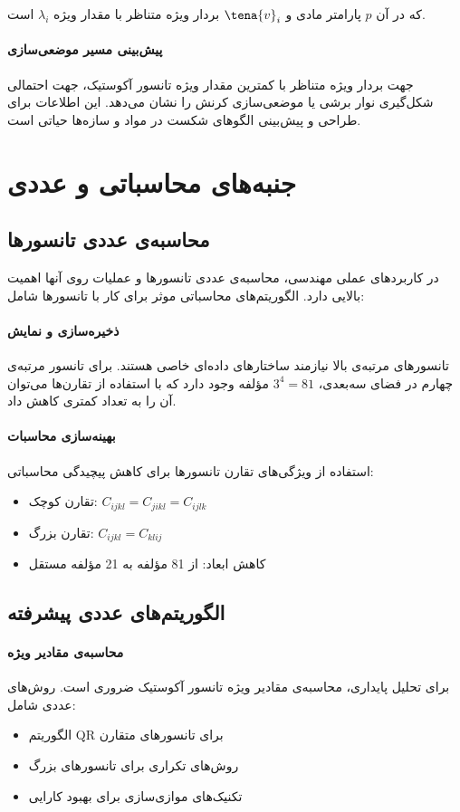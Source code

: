 که در آن $p$ پارامتر مادی و $\tena{v}_i$ بردار ویژه متناظر با مقدار ویژه $\lambda_i$ است.

\paragraph{پیش‌بینی مسیر موضعی‌سازی}
جهت بردار ویژه متناظر با کمترین مقدار ویژه تانسور آکوستیک، جهت احتمالی شکل‌گیری نوار برشی یا موضعی‌سازی کرنش را نشان می‌دهد. این اطلاعات برای طراحی و پیش‌بینی الگوهای شکست در مواد و سازه‌ها حیاتی است.

\section{جنبه‌های محاسباتی و عددی}

\subsection{محاسبه‌ی عددی تانسورها}
در کاربردهای عملی مهندسی، محاسبه‌ی عددی تانسورها و عملیات روی آنها اهمیت بالایی دارد. الگوریتم‌های محاسباتی موثر برای کار با تانسورها شامل:

\paragraph{ذخیره‌سازی و نمایش}
تانسورهای مرتبه‌ی بالا نیازمند ساختارهای داده‌ای خاصی هستند. برای تانسور مرتبه‌ی چهارم در فضای سه‌بعدی، $3^4 = 81$ مؤلفه وجود دارد که با استفاده از تقارن‌ها می‌توان آن را به تعداد کمتری کاهش داد.

\paragraph{بهینه‌سازی محاسبات}
استفاده از ویژگی‌های تقارن تانسورها برای کاهش پیچیدگی محاسباتی:
\begin{itemize}
    \item تقارن کوچک: $C_{ijkl} = C_{jikl} = C_{ijlk}$
    \item تقارن بزرگ: $C_{ijkl} = C_{klij}$
    \item کاهش ابعاد: از 81 مؤلفه به 21 مؤلفه مستقل
\end{itemize}

\subsection{الگوریتم‌های عددی پیشرفته}
\paragraph{محاسبه‌ی مقادیر ویژه}
برای تحلیل پایداری، محاسبه‌ی مقادیر ویژه تانسور آکوستیک ضروری است. روش‌های عددی شامل:
\begin{itemize}
    \item الگوریتم QR برای تانسورهای متقارن
    \item روش‌های تکراری برای تانسورهای بزرگ
    \item تکنیک‌های موازی‌سازی برای بهبود کارایی
\end{itemize}

